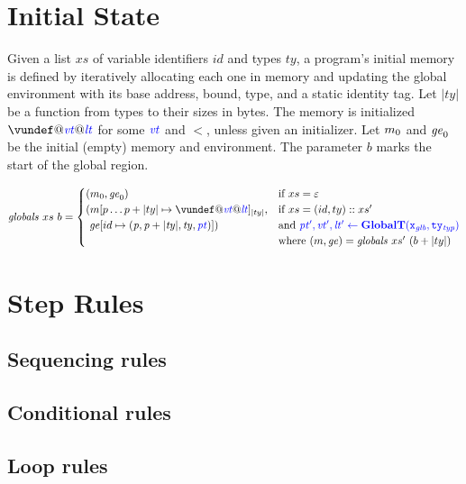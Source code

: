 \documentclass{llncs}
\begin{document}
\begin{table}[t]
\section{Initial State}

Given a list \(xs\) of variable identifiers \(id\) and types
\(ty\), a program's initial memory is defined by iteratively allocating each one
in memory and updating the global environment with its base address, bound, type,
and a static identity tag. Let \(|ty|\) be a function from types to their sizes
in bytes. The memory is initialized \(\vundef@\vt@\lt\)
for some \(\mathit{\color{blue} vt}\) and \(\lt\), unless given an initializer.
Let \(m_0\) and \(\mathit{ge}_0\) be the initial (empty) memory and environment.
The parameter \(b\) marks the start of the global region.


\[\mathit{globals} ~ xs ~ b =
\begin{cases}
  (\mem_0, \genv_0) & \textnormal{if } xs = \varepsilon \\
  (\mem[p \dots p+|ty| \mapsto \vundef@\vt@\lt]_{|ty|}, & \textnormal{if } xs = (id,ty)::xs' \\
  ~ \genv[id \mapsto (\mathit{p, p+|ty|,ty,\pt})]) & \textnormal{and } \trule{\globaltres}{\globalt} \\
  & \textnormal{where } (\mem,\genv) = \mathit{globals} ~ xs' ~ (b + |ty|) \\
\end{cases}\]

\section{Step Rules}
\label{app:rules}

\subsection{Sequencing rules}

\sequencing

\subsection{Conditional rules}

\conditionals

\subsection{Loop rules}


\end{table}
\end{document}

